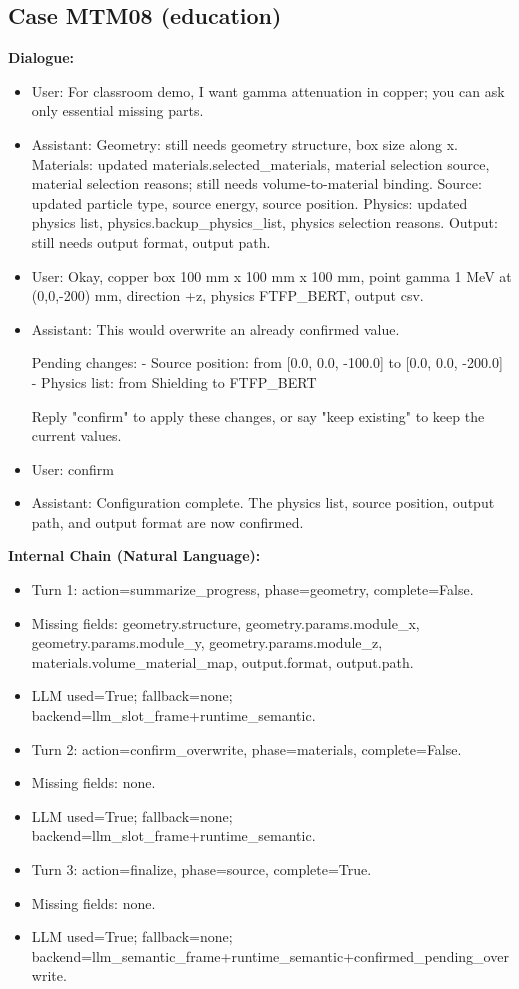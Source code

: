 \documentclass[11pt]{ctexart}
\begin{document}
\subsection{Case MTM08 (education)}
\textbf{Dialogue:}
\begin{itemize}
\item User: For classroom demo, I want gamma attenuation in copper; you can ask only essential missing parts.
\item Assistant: Geometry: still needs geometry structure, box size along x. Materials: updated materials.selected\_materials, material selection source, material selection reasons; still needs volume-to-material binding. Source: updated particle type, source energy, source position. Physics: updated physics list, physics.backup\_physics\_list, physics selection reasons. Output: still needs output format, output path.
\item User: Okay, copper box 100 mm x 100 mm x 100 mm, point gamma 1 MeV at (0,0,-200) mm, direction +z, physics FTFP\_BERT, output csv.
\item Assistant: This would overwrite an already confirmed value.

Pending changes:
- Source position: from [0.0, 0.0, -100.0] to [0.0, 0.0, -200.0]
- Physics list: from Shielding to FTFP\_BERT

Reply "confirm" to apply these changes, or say "keep existing" to keep the current values.
\item User: confirm
\item Assistant: Configuration complete. The physics list, source position, output path, and output format are now confirmed.
\end{itemize}
\textbf{Internal Chain (Natural Language):}
\begin{itemize}
\item Turn 1: action=summarize\_progress, phase=geometry, complete=False.
\item Missing fields: geometry.structure, geometry.params.module\_x, geometry.params.module\_y, geometry.params.module\_z, materials.volume\_material\_map, output.format, output.path.
\item LLM used=True; fallback=none; backend=llm\_slot\_frame+runtime\_semantic.
\item Turn 2: action=confirm\_overwrite, phase=materials, complete=False.
\item Missing fields: none.
\item LLM used=True; fallback=none; backend=llm\_slot\_frame+runtime\_semantic.
\item Turn 3: action=finalize, phase=source, complete=True.
\item Missing fields: none.
\item LLM used=True; fallback=none; backend=llm\_semantic\_frame+runtime\_semantic+confirmed\_pending\_overwrite.
\end{itemize}
\end{document}
